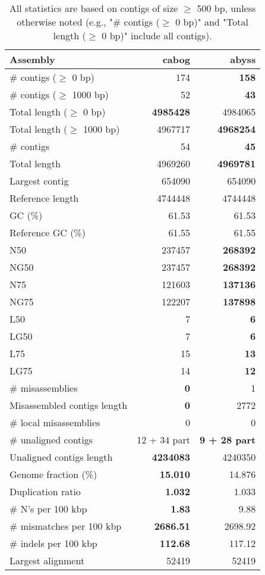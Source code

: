 \documentclass[12pt,a4paper]{article}
\begin{document}
\begin{table}[ht]
\begin{center}
\caption{All statistics are based on contigs of size $\geq$ 500 bp, unless otherwise noted (e.g., "\# contigs ($\geq$ 0 bp)" and "Total length ($\geq$ 0 bp)" include all contigs).}
\begin{tabular}{|l*{2}{|r}|}
\hline
Assembly & cabog & abyss \\ \hline
\# contigs ($\geq$ 0 bp) & 174 & {\bf 158} \\ \hline
\# contigs ($\geq$ 1000 bp) & 52 & {\bf 43} \\ \hline
Total length ($\geq$ 0 bp) & {\bf 4985428} & 4984065 \\ \hline
Total length ($\geq$ 1000 bp) & 4967717 & {\bf 4968254} \\ \hline
\# contigs & 54 & {\bf 45} \\ \hline
Total length & 4969260 & {\bf 4969781} \\ \hline
Largest contig & 654090 & 654090 \\ \hline
Reference length & 4744448 & 4744448 \\ \hline
GC (\%) & 61.53 & 61.53 \\ \hline
Reference GC (\%) & 61.55 & 61.55 \\ \hline
N50 & 237457 & {\bf 268392} \\ \hline
NG50 & 237457 & {\bf 268392} \\ \hline
N75 & 121603 & {\bf 137136} \\ \hline
NG75 & 122207 & {\bf 137898} \\ \hline
L50 & 7 & {\bf 6} \\ \hline
LG50 & 7 & {\bf 6} \\ \hline
L75 & 15 & {\bf 13} \\ \hline
LG75 & 14 & {\bf 12} \\ \hline
\# misassemblies & {\bf 0} & 1 \\ \hline
Misassembled contigs length & {\bf 0} & 2772 \\ \hline
\# local misassemblies & 0 & 0 \\ \hline
\# unaligned contigs & 12 + 34 part & {\bf 9 + 28 part} \\ \hline
Unaligned contigs length & {\bf 4234083} & 4240350 \\ \hline
Genome fraction (\%) & {\bf 15.010} & 14.876 \\ \hline
Duplication ratio & {\bf 1.032} & 1.033 \\ \hline
\# N's per 100 kbp & {\bf 1.83} & 9.88 \\ \hline
\# mismatches per 100 kbp & {\bf 2686.51} & 2698.92 \\ \hline
\# indels per 100 kbp & {\bf 112.68} & 117.12 \\ \hline
Largest alignment & 52419 & 52419 \\ \hline
\end{tabular}
\end{center}
\end{table}
\end{document}
